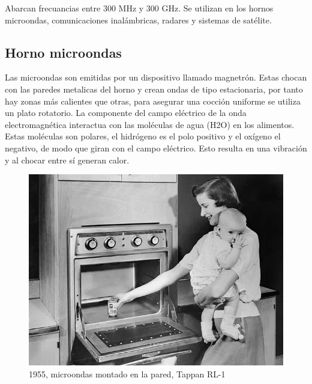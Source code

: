 Abarcan frecuancias entre 300 MHz y 300 GHz. Se utilizan en los hornos microondas, comunicaciones inalámbricas, radares y sistemas de satélite.

\subsection{Horno microondas}

Las microondas son emitidas por un dispositivo llamado magnetrón. Estas chocan con las paredes metalicas del horno y crean ondas de tipo estacionaria, por tanto hay zonas más calientes que otras, para asegurar una cocción uniforme se utiliza un plato rotatorio. La componente del campo eléctrico de la onda electromagnética interactua con las moléculas de agua (H2O) en los alimentos. Estas moléculas son polares, el hidrógeno es el polo positivo y el oxígeno el negativo, de modo que giran con el campo eléctrico. Esto resulta en una vibración y al chocar entre sí generan calor.

\begin{figure}[H]
  \centering
  \includegraphics[scale=0.5]{imagenes/microwave.png}
  \caption{1955, microondas montado en la pared, Tappan RL-1\cite{i3especmicrowave}}
\end{figure}
